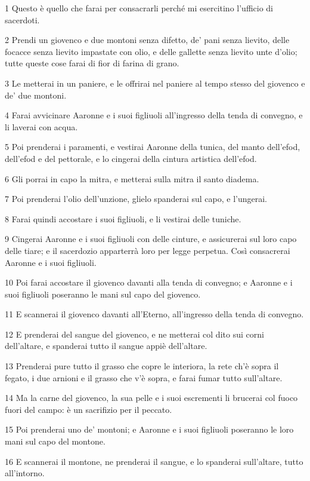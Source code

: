 \par 1 Questo è quello che farai per consacrarli perché mi esercitino l'ufficio di sacerdoti.
\par 2 Prendi un giovenco e due montoni senza difetto, de' pani senza lievito, delle focacce senza lievito impastate con olio, e delle gallette senza lievito unte d'olio; tutte queste cose farai di fior di farina di grano.
\par 3 Le metterai in un paniere, e le offrirai nel paniere al tempo stesso del giovenco e de' due montoni.
\par 4 Farai avvicinare Aaronne e i suoi figliuoli all'ingresso della tenda di convegno, e li laverai con acqua.
\par 5 Poi prenderai i paramenti, e vestirai Aaronne della tunica, del manto dell'efod, dell'efod e del pettorale, e lo cingerai della cintura artistica dell'efod.
\par 6 Gli porrai in capo la mitra, e metterai sulla mitra il santo diadema.
\par 7 Poi prenderai l'olio dell'unzione, glielo spanderai sul capo, e l'ungerai.
\par 8 Farai quindi accostare i suoi figliuoli, e li vestirai delle tuniche.
\par 9 Cingerai Aaronne e i suoi figliuoli con delle cinture, e assicurerai sul loro capo delle tiare; e il sacerdozio apparterrà loro per legge perpetua. Così consacrerai Aaronne e i suoi figliuoli.
\par 10 Poi farai accostare il giovenco davanti alla tenda di convegno; e Aaronne e i suoi figliuoli poseranno le mani sul capo del giovenco.
\par 11 E scannerai il giovenco davanti all'Eterno, all'ingresso della tenda di convegno.
\par 12 E prenderai del sangue del giovenco, e ne metterai col dito sui corni dell'altare, e spanderai tutto il sangue appiè dell'altare.
\par 13 Prenderai pure tutto il grasso che copre le interiora, la rete ch'è sopra il fegato, i due arnioni e il grasso che v'è sopra, e farai fumar tutto sull'altare.
\par 14 Ma la carne del giovenco, la sua pelle e i suoi escrementi li brucerai col fuoco fuori del campo: è un sacrifizio per il peccato.
\par 15 Poi prenderai uno de' montoni; e Aaronne e i suoi figliuoli poseranno le loro mani sul capo del montone.
\par 16 E scannerai il montone, ne prenderai il sangue, e lo spanderai sull'altare, tutto all'intorno.
